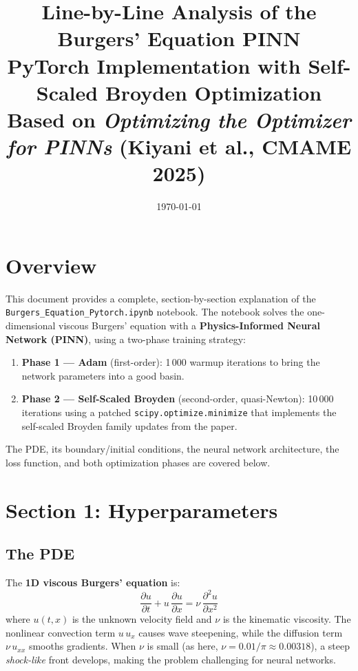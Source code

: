 \documentclass[11pt,a4paper]{article}
\title{%
  \textbf{Line-by-Line Analysis of the Burgers' Equation PINN}\\[4pt]
  \large PyTorch Implementation with Self-Scaled Broyden Optimization\\[4pt]
  \normalsize Based on \emph{Optimizing the Optimizer for PINNs} (Kiyani et al., CMAME 2025)
}
\author{}
\date{\today}
\begin{document}
\maketitle
\tableofcontents
\newpage

\section{Overview}

This document provides a complete, section-by-section explanation of the
\texttt{Burgers\_Equation\_Pytorch.ipynb} notebook. The notebook solves
the one-dimensional viscous Burgers' equation with a \textbf{Physics-Informed
Neural Network (PINN)}, using a two-phase training strategy:

\begin{enumerate}
  \item \textbf{Phase 1 --- Adam} (first-order): 1\,000 warmup iterations to
        bring the network parameters into a good basin.
  \item \textbf{Phase 2 --- Self-Scaled Broyden} (second-order, quasi-Newton):
        10\,000 iterations using a patched \texttt{scipy.optimize.minimize}
        that implements the self-scaled Broyden family updates from the paper.
\end{enumerate}

The PDE, its boundary/initial conditions, the neural network architecture,
the loss function, and both optimization phases are covered below.

\section{Section 1: Hyperparameters}
\label{sec:hyperparams}

\subsection*{The PDE}

The \textbf{1D viscous Burgers' equation} is:
\begin{equation}
\boxed{
  \frac{\partial u}{\partial t} + u\,\frac{\partial u}{\partial x}
  = \nu\,\frac{\partial^2 u}{\partial x^2}
}
\label{eq:burgers}
\end{equation}
where $u(t,x)$ is the unknown velocity field and $\nu$ is the kinematic
viscosity.  The nonlinear convection term $u\,u_x$ causes wave steepening,
while the diffusion term $\nu\,u_{xx}$ smooths gradients.  When $\nu$ is
small (as here, $\nu = 0.01/\pi \approx 0.00318$), a steep \emph{shock-like}
front develops, making the problem challenging for neural networks.
\end{document}
